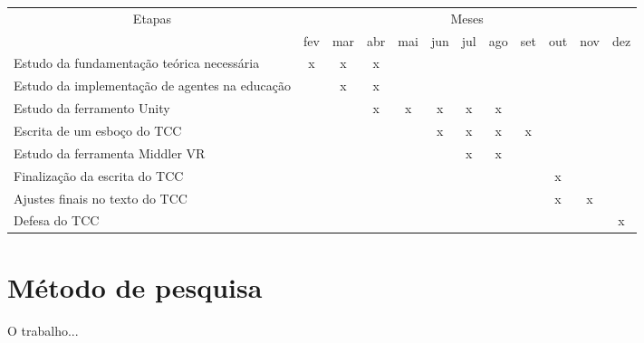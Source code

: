 \documentclass[12pt]{article}
\begin{document}
   \begin{tabularx}{\linewidth}{|X|*{11}{c|}}
        \hline
        \multicolumn{1}{|c|}{\multirow{2}{*}{Etapas}} & \multicolumn{11}{|c|}{Meses}\\ \cline{2-12}

        & fev & mar & abr & mai & jun & jul & ago & set & out & nov & dez  \\ \hline

        Estudo da fundamentação teórica necessária
        &  x  &  x  &  x  &     &     &     &     &     &     &     &     \\ \hline

        Estudo da implementação de agentes na educação
        &     &  x  &  x  &     &     &     &     &     &     &     &     \\ \hline

        Estudo da ferramento Unity
        &     &     &  x  &  x  &  x  &  x  &  x  &     &     &     &     \\ \hline

        Escrita de um esboço do TCC
        &     &     &     &     &  x  &  x  &  x  &  x  &     &     &     \\ \hline

       Estudo da ferramenta Middler VR
        &     &     &     &     &     &  x  &  x  &     &     &     &     \\ \hline

        Finalização da escrita do TCC
        &     &     &     &     &     &     &     &     &  x  &     &     \\ \hline

        Ajustes finais no texto do TCC
        &     &     &     &     &     &     &     &     &  x  &  x  &     \\ \hline

        Defesa do TCC
        &     &     &     &     &     &     &     &     &     &     &  x  \\ \hline

    \end{tabularx}

\newpage
\section{Método de pesquisa}

\hspace*{5mm}

        O trabalho...


\newpage
\end{document}
